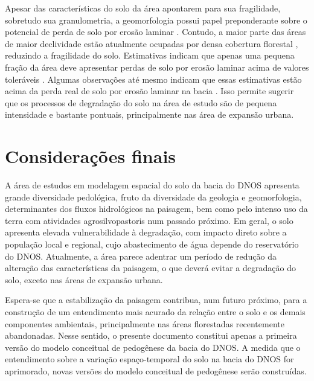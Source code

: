 Apesar das características do solo da área apontarem para sua fragilidade, sobretudo sua granulometria, a 
geomorfologia possui papel preponderante sobre o potencial de perda de solo por erosão laminar 
\cite{Miguel2010}. Contudo, a maior parte das áreas de maior declividade estão atualmente ocupadas por densa 
cobertura florestal \cite{SamuelRosaEtAl2011a}, reduzindo a fragilidade do solo. Estimativas indicam que apenas 
uma pequena fração da área deve apresentar perdas de solo por erosão laminar acima de valores toleráveis 
\cite{Miguel2010}. Algumas observações até mesmo indicam que essas estimativas estão acima da perda real de 
solo por erosão laminar na bacia \cite{Branco1998, MouraBueno2012}. Isso permite sugerir que os processos de 
degradação do solo na área de estudo são de pequena intensidade e bastante pontuais, principalmente nas área 
de expansão urbana.

\section{Considerações finais}

A área de estudos em modelagem espacial do solo da bacia do DNOS apresenta grande diversidade pedológica, 
fruto da diversidade da geologia e geomorfologia, determinantes dos fluxos hidrológicos na paisagem, bem como 
pelo intenso uso da terra com atividades agrosilvopastoris num passado próximo. Em geral, o solo apresenta 
elevada vulnerabilidade à degradação, com impacto direto sobre a população local e regional, cujo 
abastecimento de água depende do reservatório do DNOS. Atualmente, a área parece adentrar um período de redução 
da alteração das características da paisagem, o que deverá evitar a degradação do solo, exceto nas áreas de 
expansão urbana.

Espera-se que a estabilização da paisagem contribua, num futuro próximo, para a construção de um entendimento 
mais acurado da relação entre o solo e os demais componentes ambientais, principalmente nas áreas florestadas 
recentemente abandonadas. Nesse sentido, o presente documento constitui apenas a primeira versão do modelo 
conceitual de pedogênese da bacia do DNOS. A medida que o entendimento sobre a variação espaço-temporal do 
solo na bacia do DNOS for aprimorado, novas versões do modelo conceitual de pedogênese serão construídas.
